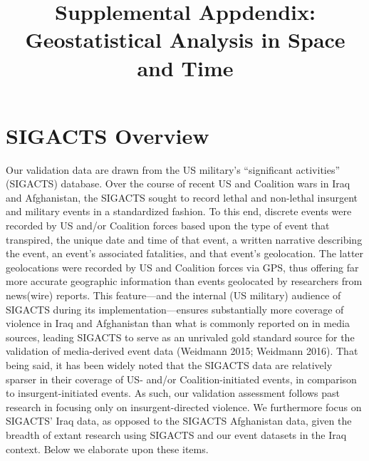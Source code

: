 \documentclass[12pt]{article}
\title{Supplemental Appdendix: Geostatistical Analysis in Space and Time}
\begin{document}
\maketitle



\section{SIGACTS Overview}
Our validation data are drawn from the US military's ``significant activities'' (SIGACTS) database. Over the course of recent US and Coalition wars in Iraq and Afghanistan, the SIGACTS sought to record lethal and non-lethal insurgent and military events in a standardized fashion. To this end, discrete events were recorded by US and/or Coalition forces based upon the type of event that transpired, the unique date and time of that event, a written narrative describing the event, an event's associated fatalities, and that event's geolocation. The latter geolocations were recorded by US and Coalition forces via GPS, thus offering far more accurate geographic information than events geolocated by researchers from news(wire) reports. This feature---and the internal (US military) audience of SIGACTS during its implementation---ensures substantially more coverage of violence in Iraq and Afghanistan than what is commonly reported on in media sources, leading SIGACTS to serve as an unrivaled gold standard source for the validation of media-derived event data (Weidmann 2015; Weidmann 2016). That being said, it has been widely noted that the SIGACTS data are relatively sparser in their coverage of US- and/or Coalition-initiated events, in comparison to insurgent-initiated events. As such, our validation assessment follows past research in focusing only on insurgent-directed violence. We furthermore focus on SIGACTS' Iraq data, as opposed to the SIGACTS Afghanistan data, given the breadth of extant research using SIGACTS and our event datasets in the Iraq context. Below we elaborate upon these items.
\end{document}
